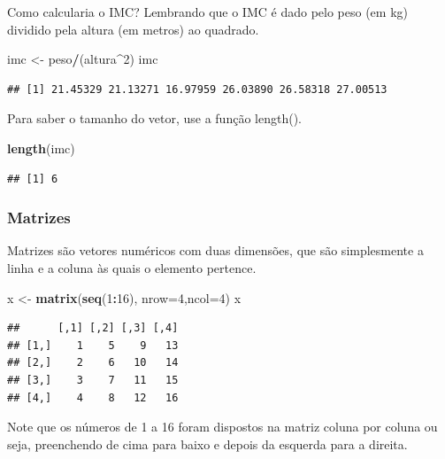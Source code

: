 \documentclass[
]{book}
\newenvironment{Shaded}{\begin{snugshade}}{\end{snugshade}}
\newcommand{\DataTypeTok}[1]{\textcolor[rgb]{0.13,0.29,0.53}{#1}}
\newcommand{\DecValTok}[1]{\textcolor[rgb]{0.00,0.00,0.81}{#1}}
\newcommand{\KeywordTok}[1]{\textcolor[rgb]{0.13,0.29,0.53}{\textbf{#1}}}
\newcommand{\NormalTok}[1]{#1}
\newcommand{\OperatorTok}[1]{\textcolor[rgb]{0.81,0.36,0.00}{\textbf{#1}}}
\newcommand{\StringTok}[1]{\textcolor[rgb]{0.31,0.60,0.02}{#1}}
\begin{document}
Como calcularia o IMC? Lembrando que o IMC é dado pelo peso (em kg) dividido pela altura (em metros) ao quadrado.

\begin{Shaded}
\begin{Highlighting}[]
\NormalTok{imc <-}\StringTok{ }\NormalTok{peso}\OperatorTok{/}\NormalTok{(altura}\OperatorTok{^}\DecValTok{2}\NormalTok{)}
\NormalTok{imc}
\end{Highlighting}
\end{Shaded}

\begin{verbatim}
## [1] 21.45329 21.13271 16.97959 26.03890 26.58318 27.00513
\end{verbatim}

Para saber o tamanho do vetor, use a função length().

\begin{Shaded}
\begin{Highlighting}[]
\KeywordTok{length}\NormalTok{(imc)}
\end{Highlighting}
\end{Shaded}

\begin{verbatim}
## [1] 6
\end{verbatim}

\hypertarget{matrizes}{%
\subsubsection{Matrizes}\label{matrizes}}

Matrizes são vetores numéricos com duas dimensões, que são simplesmente a linha e a coluna às quais o elemento pertence.

\begin{Shaded}
\begin{Highlighting}[]
\NormalTok{x <-}\StringTok{ }\KeywordTok{matrix}\NormalTok{(}\KeywordTok{seq}\NormalTok{(}\DecValTok{1}\OperatorTok{:}\DecValTok{16}\NormalTok{), }\DataTypeTok{nrow=}\DecValTok{4}\NormalTok{,}\DataTypeTok{ncol=}\DecValTok{4}\NormalTok{)}
\NormalTok{x}
\end{Highlighting}
\end{Shaded}

\begin{verbatim}
##      [,1] [,2] [,3] [,4]
## [1,]    1    5    9   13
## [2,]    2    6   10   14
## [3,]    3    7   11   15
## [4,]    4    8   12   16
\end{verbatim}

Note que os números de 1 a 16 foram dispostos na matriz coluna por coluna ou seja, preenchendo de cima para baixo e depois da esquerda para a direita.
\end{document}
